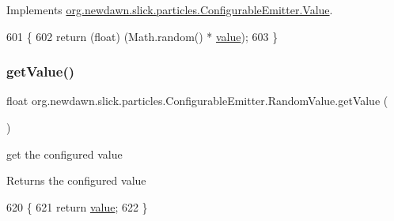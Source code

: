 Implements \mbox{\hyperlink{interfaceorg_1_1newdawn_1_1slick_1_1particles_1_1_configurable_emitter_1_1_value_aa5f167090202b78c65e324edd27e277c}{org.\+newdawn.\+slick.\+particles.\+Configurable\+Emitter.\+Value}}.


\begin{DoxyCode}
601                                           \{
602             \textcolor{keywordflow}{return} (\textcolor{keywordtype}{float}) (Math.random() * \mbox{\hyperlink{classorg_1_1newdawn_1_1slick_1_1particles_1_1_configurable_emitter_1_1_random_value_a79aeb62a3f0873cf7ca46240f9e37d09}{value}});
603         \}
\end{DoxyCode}
\mbox{\label{classorg_1_1newdawn_1_1slick_1_1particles_1_1_configurable_emitter_1_1_random_value_a7f5c6159c75523c9f4e702504b609bf6}} 
\subsubsection{\texorpdfstring{get\+Value()}{getValue()}\hspace{0.1cm}{\footnotesize\ttfamily [2/2]}}
{\footnotesize\ttfamily float org.\+newdawn.\+slick.\+particles.\+Configurable\+Emitter.\+Random\+Value.\+get\+Value (\begin{DoxyParamCaption}{ }\end{DoxyParamCaption})\hspace{0.3cm}{\ttfamily [inline]}}

get the configured value

\begin{DoxyReturn}{Returns}
the configured value 
\end{DoxyReturn}

\begin{DoxyCode}
620                                 \{
621             \textcolor{keywordflow}{return} \mbox{\hyperlink{classorg_1_1newdawn_1_1slick_1_1particles_1_1_configurable_emitter_1_1_random_value_a79aeb62a3f0873cf7ca46240f9e37d09}{value}};
622         \}
\end{DoxyCode}
\mbox{\label{classorg_1_1newdawn_1_1slick_1_1particles_1_1_configurable_emitter_1_1_random_value_a3c86f6ea416b30a58d0b491e8ed68ca5}} 
